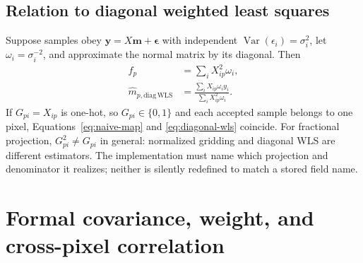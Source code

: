 \documentclass[11pt]{article}
\newcommand{\Var}{\operatorname{Var}}
\begin{document}
\subsection{Relation to diagonal weighted least squares}

Suppose samples obey
\(\boldsymbol y=X\boldsymbol m+\boldsymbol\epsilon\) with independent
\(\Var(\epsilon_i)=\sigma_i^2\), let
\(\omega_i=\sigma_i^{-2}\), and approximate the normal matrix by its diagonal.
Then
\begin{align}
  f_p &=\sum_i X_{ip}^2\omega_i,
  \label{eq:diagonal-normalization}\\
  \widehat m_{p,\mathrm{diag\,WLS}}
    &=\frac{\sum_i X_{ip}\omega_i y_i}
            {\sum_i X_{ip}^2\omega_i}.
  \label{eq:diagonal-wls}
\end{align}
If \(G_{pi}=X_{ip}\) is one-hot, so \(G_{pi}\in\{0,1\}\) and each accepted
sample belongs to one pixel, Equations~\eqref{eq:naive-map} and
\eqref{eq:diagonal-wls} coincide. For fractional projection,
\(G_{pi}^2\neq G_{pi}\) in general: normalized gridding and diagonal WLS are
different estimators. The implementation must name which projection and
denominator it realizes; neither is silently redefined to match a stored field
name.

\section{Formal covariance, weight, and cross-pixel correlation}
\end{document}

